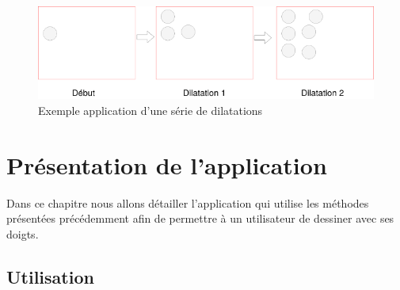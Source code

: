 \documentclass[12pt]{report}
\begin{document}
	\begin{figure}[H]
		\centering
		\includegraphics[scale=0.75]{imgs/dilatations1.png}
		\caption{Exemple application d'une série de dilatations}
		\label{fig:Dilatations}
	\end{figure}
	
	\chapter{Présentation de l'application}
	Dans ce chapitre nous allons détailler l’application qui utilise les méthodes présentées précédemment afin de permettre à un utilisateur de dessiner avec ses doigts.
	\section{Utilisation}
\end{document}
